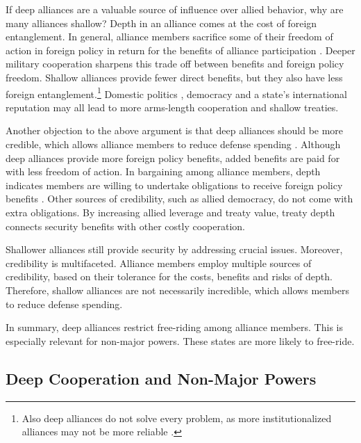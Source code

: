 \documentclass[12pt]{article}
\begin{document}
If deep alliances are a valuable source of influence over allied behavior, why are many alliances shallow? 
Depth in an alliance comes at the cost of foreign entanglement. 
In general, alliance members sacrifice some of their freedom of action in foreign policy in return for the benefits of alliance participation \citep{Altfield1984, Snyder1997}.
Deeper military cooperation sharpens this trade off between benefits and foreign policy freedom. 
Shallow alliances provide fewer direct benefits, but they also have less foreign entanglement.\footnote{Also deep alliances do not solve every problem, as more institutionalized alliances may not be more reliable \citep{LeedsAnac2005}.}
Domestic politics \citep{Davis2004}, democracy \citep{Chibaetal2015} and a state's international reputation \citep{Mattes2012} may all lead to more arms-length cooperation and shallow treaties. 


Another objection to the above argument is that deep alliances should be more credible, which allows alliance members to reduce defense spending \citep{DigiuseppePoast2016}. 
Although deep alliances provide more foreign policy benefits, added benefits are paid for with less freedom of action. 
In bargaining among alliance members, depth indicates members are willing to undertake obligations to receive foreign policy benefits \citep{Weber1997}.  
Other sources of credibility, such as allied democracy, do not come with extra obligations. 
By increasing allied leverage and treaty value, treaty depth connects security benefits with other costly cooperation. 


Shallower alliances still provide security by addressing crucial issues. 
Moreover, credibility is multifaceted. 
Alliance members employ multiple sources of credibility, based on their tolerance for the costs, benefits and risks of depth. 
Therefore, shallow alliances are not necessarily incredible, which allows members to reduce defense spending.  


In summary, deep alliances restrict free-riding among alliance members. 
This is especially relevant for non-major powers.
These states are more likely to free-ride. 


\subsection{Deep Cooperation and Non-Major Powers} 
\end{document}
